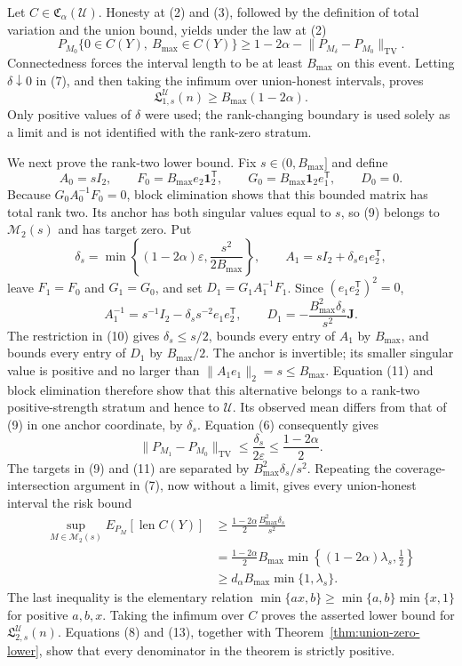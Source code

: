 Let \(C\in\mathfrak C_\alpha(\mathcal U)\).  Honesty at (2) and (3),
followed by the definition of total variation and the union bound, yields
under the law at (2)
\[
 P_{M_0}\{0\in C(Y),\ B_{\max}\in C(Y)\}
 \geq1-2\alpha-
 \lVert P_{M_\delta}-P_{M_0}\rVert_{\mathrm{TV}}.
\tag{7}
\]
Connectedness forces the interval length to be at least \(B_{\max}\) on
this event.  Letting \(\delta\downarrow0\) in (7), and then taking the
infimum over union-honest intervals, proves
\[
 \mathfrak L_{1,s}^{\mathcal U}(n)
 \geq B_{\max}(1-2\alpha).
\tag{8}
\]
Only positive values of \(\delta\) were used; the rank-changing boundary is
used solely as a limit and is not identified with the rank-zero stratum.

We next prove the rank-two lower bound.  Fix
\(s\in(0,B_{\max}]\) and define
\[
 A_0=sI_2,\qquad
 F_0=B_{\max}e_2\mathbf1_2^{\mathsf T},\qquad
 G_0=B_{\max}\mathbf1_2e_1^{\mathsf T},\qquad
 D_0=0.
\tag{9}
\]
Because \(G_0A_0^{-1}F_0=0\), block elimination shows that this bounded
matrix has total rank two.  Its anchor has both singular values equal to
\(s\), so (9) belongs to \(\mathcal M_2(s)\) and has target zero.  Put
\[
 \delta_s=\min\left\{(1-2\alpha)\varepsilon,
 \frac{s^2}{2B_{\max}}\right\},
 \qquad
 A_1=sI_2+\delta_s e_1e_2^{\mathsf T},
\tag{10}
\]
leave \(F_1=F_0\) and \(G_1=G_0\), and set
\(D_1=G_1A_1^{-1}F_1\).  Since
\((e_1e_2^{\mathsf T})^2=0\),
\[
 A_1^{-1}=s^{-1}I_2-\delta_ss^{-2}e_1e_2^{\mathsf T},
 \qquad
 D_1=-\frac{B_{\max}^2\delta_s}{s^2}\mathbf J.
\tag{11}
\]
The restriction in (10) gives \(\delta_s\leq s/2\), bounds every entry of
\(A_1\) by \(B_{\max}\), and bounds every entry of \(D_1\) by
\(B_{\max}/2\).  The anchor is invertible; its smaller singular value is
positive and no larger than \(\lVert A_1e_1\rVert_2=s\leq B_{\max}\).
Equation (11) and block elimination therefore show that this alternative
belongs to a rank-two positive-strength stratum and hence to \(\mathcal U\).
Its observed mean differs from that of (9) in one anchor coordinate, by
\(\delta_s\).  Equation (6) consequently gives
\[
 \lVert P_{M_1}-P_{M_0}\rVert_{\mathrm{TV}}
 \leq\frac{\delta_s}{2\varepsilon}
 \leq\frac{1-2\alpha}{2}.
\tag{12}
\]
The targets in (9) and (11) are separated by
\(B_{\max}^2\delta_s/s^2\).  Repeating the coverage-intersection argument
in (7), now without a limit, gives every union-honest interval the risk bound
\[
 \begin{split}
 \sup_{M\in\mathcal M_2(s)}E_{P_M}[\operatorname{len}C(Y)]
 &\geq\frac{1-2\alpha}{2}\frac{B_{\max}^2\delta_s}{s^2}\\
 &=\frac{1-2\alpha}{2}B_{\max}
 \min\left\{(1-2\alpha)\lambda_s,\frac12\right\}\\
 &\geq d_\alpha B_{\max}\min\{1,\lambda_s\}.
 \end{split}
\tag{13}
\]
The last inequality is the elementary relation
\(\min\{ax,b\}\geq\min\{a,b\}\min\{x,1\}\) for positive
\(a,b,x\).  Taking the infimum over \(C\) proves the asserted lower bound
for \(\mathfrak L_{2,s}^{\mathcal U}(n)\).  Equations (8) and (13),
together with Theorem~\ref{thm:union-zero-lower}, show that every denominator
in the theorem is strictly positive.

